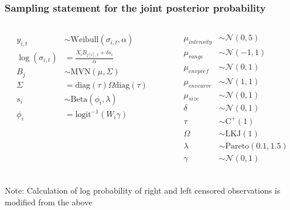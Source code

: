 \documentclass{beamer}
\begin{document}
\begin{frame}
  \frametitle{Sampling statement for the joint posterior probability}
  \begin{columns}
    \begin{column}{0.5\textwidth}
      \begin{align*}
        y_{i, t} &\sim \text{Weibull}(\sigma_{i, t}, \alpha) \\
        \log(\sigma_{i, t}) &= \frac{X_{i}B_{j[i], t} + \delta s_{i}}{\alpha} \\
        B_{j} &\sim \text{MVN}(\mu, \Sigma) \\
        \Sigma &= \text{diag}(\tau) \Omega \text{diag}(\tau) \\
        s_{i} &\sim \text{Beta}(\phi_{i}, \lambda) \\
        \phi_{i} &= \text{logit}^{-1}(W_{i}\gamma) \\
      \end{align*}
    \end{column}
    \begin{column}{0.5\textwidth}
      \begin{align*}
        \mu_{intensity} &\sim \mathcal{N}(0, 5) \\
        \mu_{range} &\sim \mathcal{N}(-1, 1) \\
        \mu_{env pref} &\sim \mathcal{N}(0, 1) \\
        \mu_{env curve} &\sim \mathcal{N}(1, 1) \\
        \mu_{size} &\sim \mathcal{N}(0, 1) \\
        \delta &\sim \mathcal{N}(0, 1) \\
        \tau &\sim \text{C}^{+}(1) \\
        \Omega &\sim \text{LKJ}(1) \\
        \lambda &\sim \text{Pareto}(0.1, 1.5) \\
        \gamma &\sim \mathcal{N}(0, 1) \\
      \end{align*}
    \end{column}
  \end{columns}

  \scriptsize{Note: Calculation of log probability of right and left censored observations is modified from the above}
\end{frame}
\end{document}
